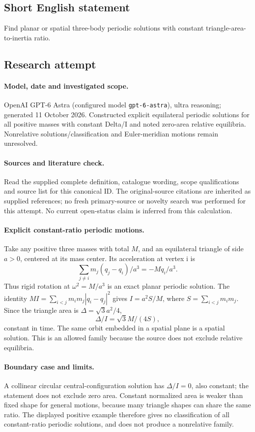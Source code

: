 \documentclass[11pt]{article}
\begin{document}
\subsection{Short English statement}
Find planar or spatial three-body periodic solutions with constant triangle-area-to-inertia ratio.
\subsection{Research attempt}
\paragraph{Model, date and investigated scope.}
OpenAI GPT-6 Astra (configured model \texttt{gpt-6-astra}), ultra reasoning; generated 11 October 2026. Constructed explicit equilateral periodic solutions for all positive masses with constant Delta/I and noted zero-area relative equilibria. Nonrelative solutions/classification and Euler-meridian motions remain unresolved.

\paragraph{Sources and literature check.}
Read the supplied complete definition, catalogue wording, scope qualifications and source list for this canonical ID. The original-source citations are inherited as supplied references; no fresh primary-source or novelty search was performed for this attempt. No current open-status claim is inferred from this calculation.

\paragraph{Explicit constant-ratio periodic motions.}Take any positive three masses with total \(M\), and an equilateral triangle of side \(a>0\), centered at its mass center. Its acceleration at vertex i is
\[\sum_{j\ne i}m_j(q_j-q_i)/a^3=-Mq_i/a^3.
\]
Thus rigid rotation at \(\omega^2=M/a^3\) is an exact planar periodic solution. The identity \(MI=\sum_{i<j}m_im_j|q_i-q_j|^2\) gives \(I=a^2S/M\), where \(S=\sum_{i<j}m_im_j\). Since the triangle area is \(\Delta=\sqrt3a^2/4\),
\[\Delta/I=\sqrt3 M/(4S),
\]
constant in time. The same orbit embedded in a spatial plane is a spatial solution. This is an allowed family because the source does not exclude relative equilibria.
\paragraph{Boundary case and limits.}A collinear circular central-configuration solution has \(\Delta/I=0\), also constant; the statement does not exclude zero area. Constant normalized area is weaker than fixed shape for general motions, because many triangle shapes can share the same ratio. The displayed positive example therefore gives no classification of all constant-ratio periodic solutions, and does not produce a nonrelative family.
\end{document}
